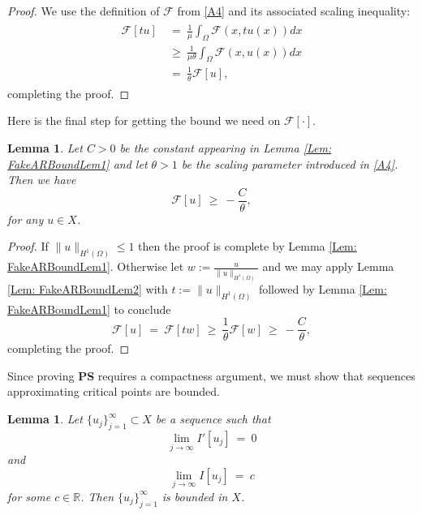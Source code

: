 \documentclass[11pt]{amsart}   	%
\theoremstyle{plain}
\numberwithin{equation}{section}
\newtheorem{lemma}[thm]{Lemma}
\def\Om{\Omega}
\def\th{\theta}
\def\R{\mathbb{R}}
\begin{document}
\begin{proof}
We use the definition of $\mathcal{F}$ from \ref{A4} and its associated scaling inequality:
\begin{eqnarray}\label{Eq: FakeARBoundLem2Eq1}
    \begin{aligned}
        \mathscr{F}[tu] \ &= \ \frac{1}{\mu}\int_{\Om}\mathcal{F}(x, tu(x))dx \\
        \ &\geq \ \frac{1}{\mu \th}\int_{\Om}\mathcal{F}(x, u(x))dx \\
        \ &= \ \frac{1}{\th}\mathscr{F}[u],
    \end{aligned}
\end{eqnarray}
completing the proof.
\end{proof}

Here is the final step for getting the bound we need on $\mathscr{F}[\cdot]$.

\begin{lemma}\label{Lem: FakeARBoundLem3}
     Let $C > 0$ be the constant appearing in Lemma \ref{Lem: FakeARBoundLem1} and let $\th > 1$ be the scaling parameter introduced in \ref{A4}. Then we have
     \begin{equation}\label{Eq: FakeARBoundLem3Eq}
         \mathscr{F}[u] \ \geq \ -\frac{C}{\th},
     \end{equation}
     for any $u \in X$.
\end{lemma}

\begin{proof}
If $\|u\|_{H^1(\Om)} \leq 1$ then the proof is complete by Lemma \ref{Lem: FakeARBoundLem1}. Otherwise let $w := \frac{u}{\|u\|_{H^1(\Om)}}$ and we may apply Lemma \ref{Lem: FakeARBoundLem2} with $t := \|u\|_{H^1(\Om)}$ followed by Lemma \ref{Lem: FakeARBoundLem1} to conclude
\begin{equation}\label{Eq: FakeARBoundLem3Eq1}
    \mathscr{F}[u] \ = \ \mathscr{F}[tw] \ \geq \ \frac{1}{\th}\mathscr{F}[w] \ \geq \ -\frac{C}{\th},
\end{equation}
completing the proof.
\end{proof}

Since proving \textbf{PS} requires a compactness argument, we must show that sequences approximating critical points are bounded.

\begin{lemma}\label{Lem: Deriv->0}
    Let $\{u_j\}^{\infty}_{j = 1} \subset X$ be a sequence such that \begin{equation}\label{Eq: PSCriterionDeriv}
    \lim_{j \rightarrow \infty}I'[u_j] \ = \ 0
    \end{equation}
    and 
    \begin{equation}\label{Eq: PSCriterion}
    \lim_{j \rightarrow \infty}I[u_j]\ = \ c
    \end{equation}
    for some $c \in \R$. Then $\{u_j\}^{\infty}_{j = 1}$ is bounded in $X$.
\end{lemma}
\end{document}
